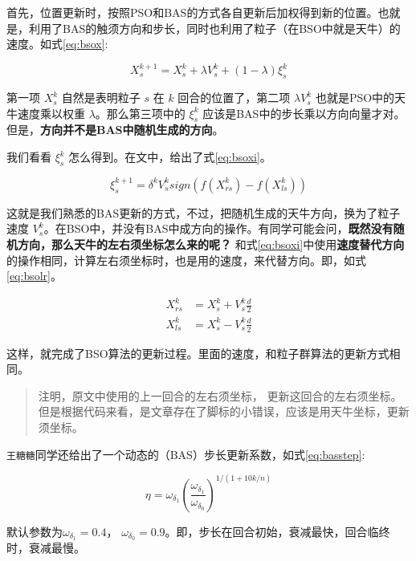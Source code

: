 \documentclass[]{ctexbook}
\begin{document}
首先，位置更新时，按照PSO和BAS的方式各自更新后加权得到新的位置。也就是，利用了BAS的触须方向和步长，同时也利用了粒子（在BSO中就是天牛）的速度。如式\eqref{eq:bsox}:

\begin{equation}
X_{s}^{k+1} = X_{s}^{k} + \lambda V_{s}^k + (1 - \lambda)\xi_{s}^k
\label{eq:bsox}
\end{equation}

第一项 \(X_{s}^{k}\) 自然是表明粒子 \(s\) 在 \(k\) 回合的位置了，第二项
\(\lambda V_{s}^k\) 也就是PSO中的天牛速度乘以权重
\(\lambda\)。那么第三项中的 \(\xi_{s}^k\)
应该是BAS中的步长乘以方向向量才对。但是，\textbf{方向并不是BAS中随机生成的方向}。

我们看看 \(\xi_s^k\) 怎么得到。在文中，给出了式\eqref{eq:bsoxi}。

\begin{equation}
\xi_s^{k+1} = \delta^kV_s^ksign(f(X_{rs}^k) - f(X_{ls}^k))
\label{eq:bsoxi}
\end{equation}

这就是我们熟悉的BAS更新的方式，不过，把随机生成的天牛方向，换为了粒子速度
\(V_s^k\)。在BSO中，并没有BAS中成方向的操作。有同学可能会问，\textbf{既然没有随机方向，那么天牛的左右须坐标怎么来的呢？}
和式\eqref{eq:bsoxi}中使用\textbf{速度替代方向}的操作相同，计算左右须坐标时，也是用的速度，来代替方向。即，如式\eqref{eq:bsolr}。

\begin{equation}
\begin{split}
X_{rs}^k&=X_{s}^k+V_s^k\frac{d}{2} \\
X_{ls}^k&=X_{s}^k-V_s^k\frac{d}{2}
\end{split}
\label{eq:bsolr}
\end{equation}

这样，就完成了BSO算法的更新过程。里面的速度，和粒子群算法的更新方式相同。

\begin{quote}
注明，原文中使用的上一回合的左右须坐标，
更新这回合的左右须坐标。但是根据代码来看，是文章存在了脚标的小错误，应该是用天牛坐标，更新须坐标。
\end{quote}

\texttt{王糖糖}同学还给出了一个动态的（BAS）步长更新系数，如式\eqref{eq:basstep}:

\begin{equation}
\eta = \omega_{\delta_1}(\frac{\omega_{\delta_1}}{\omega_{\delta_0}})^{1/(1+10k/n)}
\label{eq:basstep}
\end{equation}

默认参数为\(\omega_{\delta_1} = 0.4\)，
\(\omega_{\delta_0} = 0.9\)。即，步长在回合初始，衰减最快，回合临终时，衰减最慢。
\end{document}
